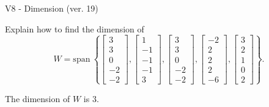 \begin{exercise}
  \begin{exerciseTitle}V8 - Dimension (ver. 19)\end{exerciseTitle}
  \begin{exerciseStatement}
    Explain how to find the dimension of 
\[W=\mathrm{span}\ \left\{\left[\begin{array}{r}
3 \\
3 \\
0 \\
-2 \\
-2
\end{array}\right] , \left[\begin{array}{r}
1 \\
-1 \\
-1 \\
-1 \\
3
\end{array}\right] , \left[\begin{array}{r}
3 \\
3 \\
0 \\
-2 \\
-2
\end{array}\right] , \left[\begin{array}{r}
-2 \\
2 \\
2 \\
2 \\
-6
\end{array}\right] , \left[\begin{array}{r}
3 \\
2 \\
1 \\
0 \\
2
\end{array}\right]\right\}.\]



  \end{exerciseStatement}
  \begin{exerciseAnswer}
   The dimension of \(W\) is  \(3\).
  


  \end{exerciseAnswer}
\end{exercise}